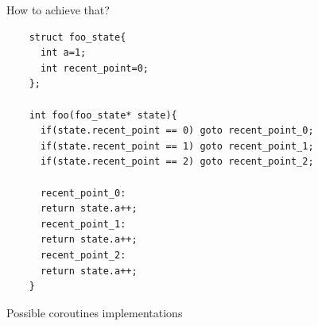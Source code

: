 \documentclass[10pt]{beamer}
\begin{document}
\begin{frame}[fragile]{How to achieve that?}
\begin{verbatim}
    struct foo_state{
      int a=1;
      int recent_point=0;
    };

    int foo(foo_state* state){
      if(state.recent_point == 0) goto recent_point_0;
      if(state.recent_point == 1) goto recent_point_1;
      if(state.recent_point == 2) goto recent_point_2;
  
      recent_point_0:
      return state.a++;
      recent_point_1:
      return state.a++;
      recent_point_2:
      return state.a++;
    }
\end{verbatim}
\end{frame}

\begin{frame}{Possible coroutines implementations}
\begin{columns}[t]


\end{columns}
\end{frame}
\end{document}
